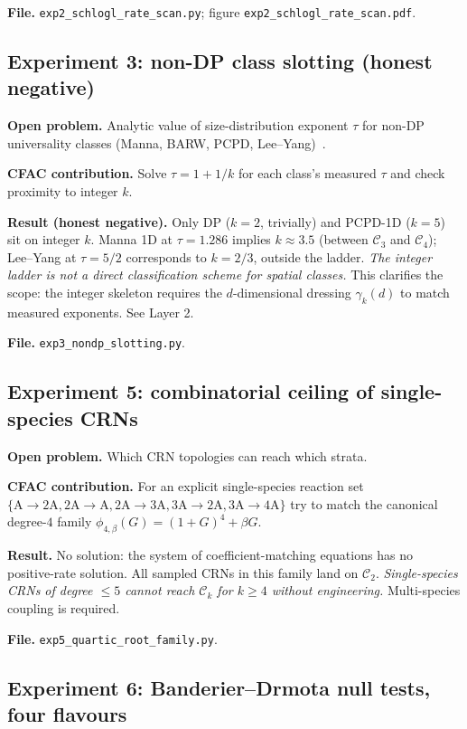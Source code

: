 \documentclass[11pt,a4paper]{article}
\theoremstyle{plain}
\newcommand{\Ck}{\mathcal{C}}
\begin{document}
\textbf{File.}  \texttt{exp2\_schlogl\_rate\_scan.py};
figure \texttt{exp2\_schlogl\_rate\_scan.pdf}.

\subsection*{Experiment 3: non-DP class slotting (honest negative)}

\textbf{Open problem.}  Analytic value of size-distribution exponent
$\tau$ for non-DP universality classes (Manna, BARW, PCPD,
Lee--Yang)~\citep{Hinrichsen2000,Odor2004}.

\textbf{CFAC contribution.}  Solve $\tau = 1 + 1/k$ for each class's
measured $\tau$ and check proximity to integer $k$.

\textbf{Result (honest negative).}  Only DP ($k=2$, trivially) and PCPD-1D
($k=5$) sit on integer $k$.  Manna 1D at $\tau=1.286$ implies $k\approx 3.5$
(between $\Ck_{3}$ and $\Ck_{4}$); Lee--Yang at $\tau=5/2$ corresponds to
$k=2/3$, outside the ladder.  \emph{The integer ladder is not a direct
classification scheme for spatial classes.}  This clarifies the scope:
the integer skeleton requires the $d$-dimensional dressing
$\gamma_{k}(d)$ to match measured exponents.  See Layer 2.

\textbf{File.}  \texttt{exp3\_nondp\_slotting.py}.

\subsection*{Experiment 5: combinatorial ceiling of single-species CRNs}

\textbf{Open problem.}  Which CRN topologies can reach which strata.

\textbf{CFAC contribution.}  For an explicit single-species reaction set
$\{\mathrm{A}\to 2\mathrm{A}, 2\mathrm{A}\to\mathrm{A},
2\mathrm{A}\to 3\mathrm{A}, 3\mathrm{A}\to 2\mathrm{A},
3\mathrm{A}\to 4\mathrm{A}\}$ try to match the canonical degree-$4$
family $\phi_{4,\beta}(G) = (1+G)^{4} + \beta G$.

\textbf{Result.}  No solution: the system of coefficient-matching
equations has no positive-rate solution.  All sampled CRNs in this family
land on $\Ck_{2}$.  \emph{Single-species CRNs of degree $\leq 5$ cannot
reach $\Ck_{k}$ for $k\geq 4$ without engineering.}  Multi-species
coupling is required.

\textbf{File.}  \texttt{exp5\_quartic\_root\_family.py}.

\subsection*{Experiment 6: Banderier--Drmota null tests, four flavours}
\end{document}
